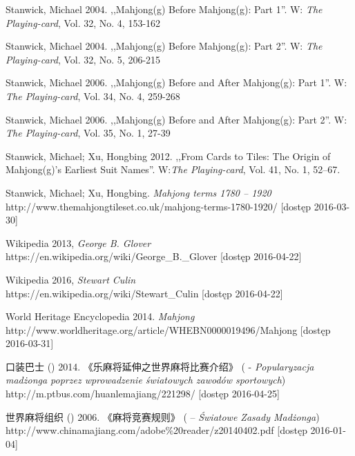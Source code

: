 Stanwick, Michael 2004. ,,Mahjong(g) Before Mahjong(g): Part 1''. W:
\textit{The Playing-card}, Vol. 32, No. 4, 153-162

Stanwick, Michael 2004. ,,Mahjong(g) Before Mahjong(g): Part 2''. W:
\textit{The Playing-card}, Vol. 32, No. 5, 206-215

Stanwick, Michael 2006. ,,Mahjong(g) Before and After Mahjong(g): Part 1''. W:
\textit{The Playing-card}, Vol. 34, No. 4, 259-268

Stanwick, Michael 2006. ,,Mahjong(g) Before and After Mahjong(g): Part 2''. W:
\textit{The Playing-card}, Vol. 35, No. 1, 27-39


Stanwick, Michael; Xu, Hongbing 2012. ,,From Cards to Tiles: The Origin of
Mahjong(g)’s Earliest Suit Names''. W:\textit{The Playing-card}, Vol. 41, No. 1,
52–67.

Stanwick, Michael; Xu, Hongbing. \textit{Mahjong terms 1780 – 1920}
\\http://www.themahjongtileset.co.uk/mahjong-terms-1780-1920/ [dostęp
2016-03-30]

Wikipedia 2013, \textit{George B. Glover}
\\https://en.wikipedia.org/wiki/George\_B.\_Glover [dostęp 2016-04-22]

Wikipedia 2016, \textit{Stewart Culin}
\\https://en.wikipedia.org/wiki/Stewart\_Culin [dostęp 2016-04-22]

World Heritage Encyclopedia 2014. \textit{Mahjong}
\\http://www.worldheritage.org/article/WHEBN0000019496/Mahjong [dostęp
2016-03-31]

口装巴士 () 2014. 《乐麻将延伸之世界麻将比赛介绍》 ( - \textit{Popularyzacja madżonga
poprzez wprowadzenie światowych zawodów sportowych})
\\http://m.ptbus.com/huanlemajiang/221298/ [dostęp 2016-04-25]

世界麻将组织 () 2006. 《麻将竞赛规则》 ( -- \textit{Światowe Zasady Madżonga})
\\http://www.chinamajiang.com/adobe\%20reader/z20140402.pdf [dostęp 2016-01-04]





